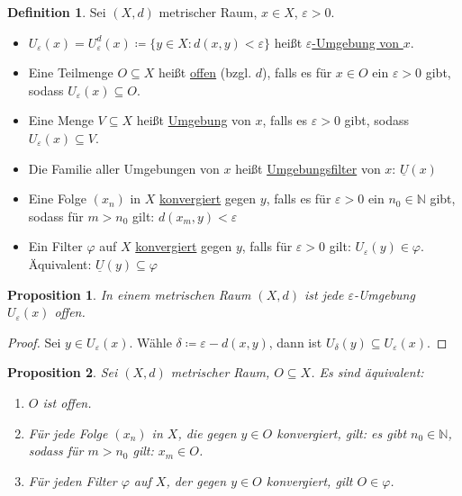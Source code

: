 \documentclass[12pt]{scrartcl}%
\newtheorem{prop}{Proposition}
\theoremstyle{definition}
\newtheorem*{defn}{Definition}
\theoremstyle{remark}
\begin{document}
\begin{defn}
    Sei $(X, d)$ metrischer Raum, $x\in X$, $\varepsilon > 0$.

    \begin{itemize}
        \item $U_\varepsilon(x)=U_\varepsilon^d(x)\coloneqq \{y\in X: d(x,y) < \varepsilon\}$ heißt \underline{$\varepsilon$-Umgebung von $x$}.
        \item Eine Teilmenge $O\subseteq X$ heißt \underline{offen} (bzgl. $d$), falls es für $x\in O$ ein $\varepsilon > 0$ gibt, sodass $U_\varepsilon(x)\subseteq O$.
        \item Eine Menge $V\subseteq X$ heißt \underline{Umgebung} von $x$, falls es $\varepsilon > 0$ gibt, sodass $U_\varepsilon(x)\subseteq V$.
        \item Die Familie aller Umgebungen von $x$ heißt \underline{Umgebungsfilter} von $x$: $\underline{U}(x)$
        \item Eine Folge $(x_n)$ in $X$ \underline{konvergiert} gegen $y$, falls es für $\varepsilon > 0$ ein $n_0\in \mathbb{N}$ gibt, sodass für $m > n_0$ gilt: $d(x_m, y) < \varepsilon$
        \item Ein Filter $\varphi$ auf $X$ \underline{konvergiert} gegen $y$, falls für $\varepsilon > 0$ gilt: $U_\varepsilon(y)\in\varphi$. Äquivalent: $\underline{U}(y)\subseteq \varphi$
    \end{itemize}
\end{defn}

\begin{prop}
    In einem metrischen Raum $(X, d)$ ist jede $\varepsilon$-Umgebung $U_\varepsilon(x)$ offen.
\end{prop}

\begin{proof}
    Sei $y\in U_\varepsilon(x)$. Wähle $\delta\coloneqq \varepsilon-d(x,y)$, dann ist $U_\delta(y)\subseteq U_\varepsilon(x)$.
\end{proof}

\begin{prop}
    Sei $(X, d)$ metrischer Raum, $O\subseteq X$. Es sind äquivalent:

    \begin{enumerate}[label=(\arabic*)]
        \item $O$ ist offen.
        \item Für jede Folge $(x_n)$ in $X$, die gegen $y\in O$ konvergiert, gilt: es gibt $n_0\in\mathbb{N}$, sodass für $m > n_0$ gilt: $x_m\in O$.
        \item Für jeden Filter $\varphi$ auf $X$, der gegen $y\in O$ konvergiert, gilt $O\in \varphi$.
    \end{enumerate}
\end{prop}
\end{document}

